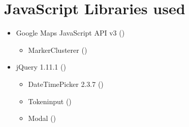 \section{JavaScript Libraries used}
\begin{itemize}
  \item Google Maps JavaScript API v3 (\cite{website:maps-api-js})
  \begin{itemize}
    \item MarkerClusterer (\cite{website:maps-clusterer})
  \end{itemize}
  \item jQuery 1.11.1 (\cite{website:jquery})
  \begin{itemize}
    \item DateTimePicker 2.3.7 (\cite{website:datetime})
    \item Tokeninput (\cite{website:tokeninput})
    \item Modal (\cite{website:modal})
  \end{itemize}
\end{itemize}